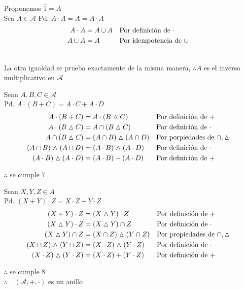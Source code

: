 \documentclass[letterpaper]{article}
\newcommand{\A}{\mathcal{A}}
\newcommand{\dsim}{\vartriangle}
\renewcommand{\*}{\cdot}
\theoremstyle{definition}
\begin{document}
Proponemos $ \hat{1} = A $\\
Sea $ A \in \A $ Pd. $ A \* A = A = A \* A $
\begin{align*}
	 A \* A &= A \cup A && \text{Por definición de $ \* $}\\
	 A \cup A &= A  && \text{Por idempotencia de $ \cup $}\\
	 \\
\end{align*}
\begin{center}
	La otra igualdad se prueba exactamente de la misma manera,
	$ \therefore A $ es el inverso multiplicativo en $ \A $
\end{center}
Sean $ A, B, C \in \A $\\
Pd. $ A \* (B + C) = A\*C + A\*D $
\begin{align*}
	A \* (B + C) & = A \* (B \dsim C) && \text{Por definición de $ + $}\\
	A \* (B \dsim C) & = A \cap(B \dsim C)  && \text{Por definición de $ \*$}\\
	A \cap(B \dsim C) & = (A \cap B) \dsim (A \cap D) && \text{Por porpiedades de $ \cap, \dsim $}\\
	(A \cap B) \dsim (A \cap D) & = (A \* B) \dsim (A \* D) && \text{Por definición de $ \*$}\\
	(A \* B) \dsim (A \* D) & = (A \* B) + (A \* D)  && \text{Por definición de $ +$}\\
\end{align*}
\begin{center}
	$ \therefore $ se cumple 7
\end{center}
Sean $ X, Y, Z \in A $\\
Pd. $ (X+Y)\*Z = X\*Z + Y\*Z $
\begin{align*}
	(X+Y)\*Z &= (X \dsim Y)\*Z && \text{Por definición de $ + $}\\
	(X \dsim Y)\*Z &= (X \dsim Y)\cap Z && \text{Por definición de $ \* $}\\
	(X \dsim Y)\cap Z  &= (X\cap Z) \dsim (Y\cap Z)  && \text{Por propiedades de $ \cap, \dsim$}\\
	(X\cap Z) \dsim (Y\cap Z)  &=  (X\* Z) \dsim (Y\* Z) && \text{Por definición de $ \*$}\\
	(X\* Z) \dsim (Y\* Z) &= (X\* Z) + (Y\* Z) && \text{Por definición de $ + $}
\end{align*}
\begin{center}
	$ \therefore $ se cumple 8\\
	$ \therefore \quad (\A, +, \*)$ es un anillo
\end{center}
\end{document}
